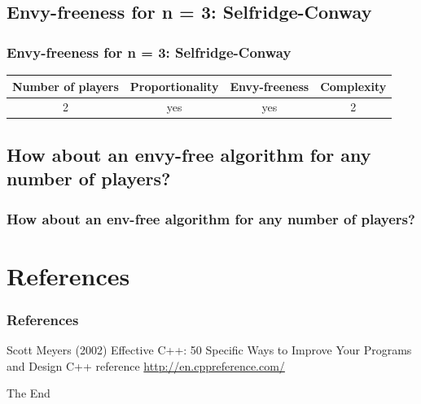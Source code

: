 \documentclass{beamer}
\begin{document}
\subsection{Envy-freeness for n = 3: Selfridge-Conway}
\begin{frame}
\frametitle{Envy-freeness for n = 3: Selfridge-Conway}
\begin{table}
\begin{tabular}{c|c|c|c|}
Number of players & Proportionality & Envy-freeness & Complexity \\
\hline 
2 & yes & yes & 2 \\
\end{tabular}
\end{table}

\end{frame}

\subsection{How about an envy-free algorithm for any number of players?}
\begin{frame}
\frametitle{How about an env-free algorithm for any number of players?}
\end{frame}


\section{References}
\begin{frame}
\frametitle{References}
\footnotesize{
\begin{thebibliography}{99} %
 Scott Meyers (2002)
\newblock Effective C++: 50 Specific Ways to Improve Your Programs and Design
 C++ reference
\newblock \url{http://en.cppreference.com/}
\end{thebibliography}
}
\end{frame}


\begin{frame}
\Huge{\centerline{The End}}
\end{frame}

\end{document}
